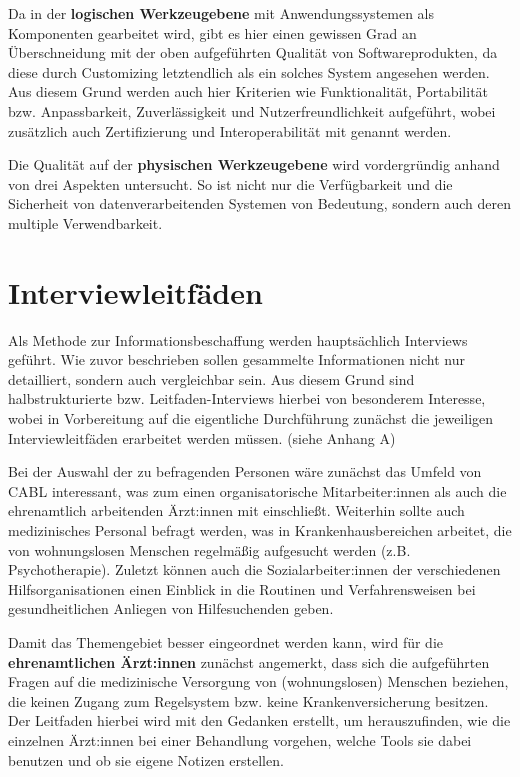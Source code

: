 Da in der \textbf{logischen Werkzeugebene} mit Anwendungssystemen als Komponenten gearbeitet wird, gibt es hier einen gewissen Grad an Überschneidung mit der oben aufgeführten Qualität von Softwareprodukten, da diese durch Customizing letztendlich als ein solches System angesehen werden. Aus diesem Grund werden auch hier Kriterien wie Funktionalität, Portabilität bzw. Anpassbarkeit, Zuverlässigkeit und Nutzerfreundlichkeit aufgeführt, wobei zusätzlich auch Zertifizierung und Interoperabilität mit genannt werden.

Die Qualität auf der \textbf{physischen Werkzeugebene} wird vordergründig anhand von drei Aspekten untersucht. So ist nicht nur die Verfügbarkeit und die Sicherheit von datenverarbeitenden Systemen von Bedeutung, sondern auch deren multiple Verwendbarkeit.


\section{Interviewleitfäden}

Als Methode zur Informationsbeschaffung werden hauptsächlich Interviews geführt. Wie zuvor beschrieben sollen gesammelte Informationen nicht nur detailliert, sondern auch vergleichbar sein. Aus diesem Grund sind halbstrukturierte bzw. Leitfaden-Interviews hierbei von besonderem Interesse, wobei in Vorbereitung auf die eigentliche Durchführung zunächst die jeweiligen Interviewleitfäden erarbeitet werden müssen. (siehe Anhang A)

Bei der Auswahl der zu befragenden Personen wäre zunächst das Umfeld von CABL interessant, was zum einen organisatorische Mitarbeiter:innen als auch die ehrenamtlich arbeitenden Ärzt:innen mit einschließt. Weiterhin sollte auch medizinisches Personal befragt werden, was in Krankenhausbereichen arbeitet, die von wohnungslosen Menschen regelmäßig aufgesucht werden (z.B. Psychotherapie). Zuletzt können auch die Sozialarbeiter:innen der verschiedenen Hilfsorganisationen einen Einblick in die Routinen und Verfahrensweisen bei gesundheitlichen Anliegen von Hilfesuchenden geben.

Damit das Themengebiet besser eingeordnet werden kann, wird für die \textbf{ehrenamtlichen Ärzt:innen} zunächst angemerkt, dass sich die aufgeführten Fragen auf die medizinische Versorgung von (wohnungslosen) Menschen beziehen, die keinen Zugang zum Regelsystem bzw. keine Krankenversicherung besitzen. Der Leitfaden hierbei wird mit den Gedanken erstellt, um herauszufinden, wie die einzelnen Ärzt:innen bei einer Behandlung vorgehen, welche Tools sie dabei benutzen und ob sie eigene Notizen erstellen.

